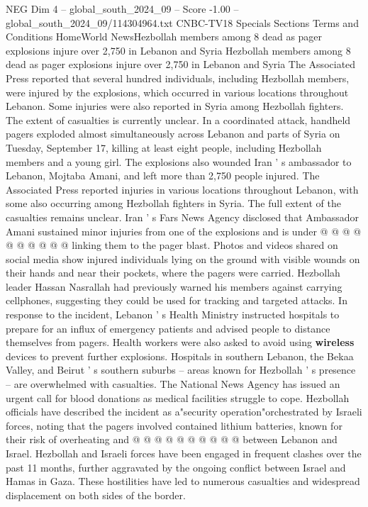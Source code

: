 \begin{textsample}{NEG Dim 4 – global\_south\_2024\_09 – Score -1.00 – global\_south\_2024\_09/114304964.txt}  \label{ex:f4_neg_185}
CNBC-TV18 Specials Sections Terms and Conditions HomeWorld NewsHezbollah members among 8 dead as pager explosions injure over 2,750 in Lebanon and Syria Hezbollah members among 8 dead as pager explosions injure over 2,750 in Lebanon and Syria The Associated Press reported that several hundred individuals, including Hezbollah members, were injured by the explosions, which occurred in various locations throughout Lebanon.
Some injuries were also reported in Syria among Hezbollah fighters.
The extent of casualties is currently unclear.
In a coordinated attack, handheld pagers exploded almost simultaneously across Lebanon and parts of Syria on Tuesday, September 17, killing at least eight people, including Hezbollah members and a young girl.
The explosions also wounded Iran ' s ambassador to Lebanon, Mojtaba Amani, and left more than 2,750 people injured.
The Associated Press reported injuries in various locations throughout Lebanon, with some also occurring among Hezbollah fighters in Syria.
The full extent of the casualties remains unclear.
Iran ' s Fars News Agency disclosed that Ambassador Amani sustained minor injuries from one of the explosions and is under @ @ @ @ @ @ @ @ @ @ linking them to the pager blast.
Photos and videos shared on social media show injured individuals lying on the ground with visible wounds on their hands and near their pockets, where the pagers were carried.
Hezbollah leader Hassan Nasrallah had previously warned his members against carrying cellphones, suggesting they could be used for tracking and targeted attacks.
In response to the incident, Lebanon ' s Health Ministry instructed hospitals to prepare for an influx of emergency patients and advised people to distance themselves from pagers.
Health workers were also asked to avoid using \textbf{wireless} devices to prevent further explosions.
Hospitals in southern Lebanon, the Bekaa Valley, and Beirut ' s southern suburbs -- areas known for Hezbollah ' s presence -- are overwhelmed with casualties.
The National News Agency has issued an urgent call for blood donations as medical facilities struggle to cope.
Hezbollah officials have described the incident as a"security operation"orchestrated by Israeli forces, noting that the pagers involved contained lithium batteries, known for their risk of overheating and @ @ @ @ @ @ @ @ @ @ between Lebanon and Israel.
Hezbollah and Israeli forces have been engaged in frequent clashes over the past 11 months, further aggravated by the ongoing conflict between Israel and Hamas in Gaza.
These hostilities have led to numerous casualties and widespread displacement on both sides of the border.

\end{textsample}
